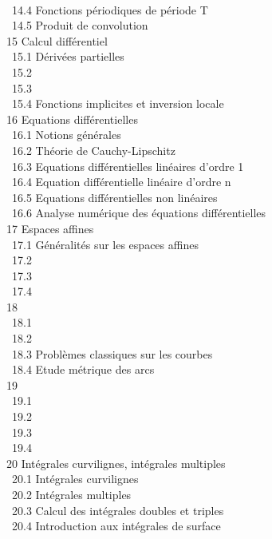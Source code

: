 \documentclass[]{article}
\begin{document}
\\ ~14.4 {Fonctions périodiques de
période T} \\ ~14.5 {Produit de
convolution} \\ 15 {Calcul
différentiel} \\ ~15.1 {Dérivées
partielles} \\ ~15.2
 \\ ~15.3
 \\ ~15.4
{Fonctions implicites et inversion
locale} \\ 16 {Equations
différentielles} \\ ~16.1 {Notions
générales} \\ ~16.2 {Théorie de
Cauchy-Lipschitz} \\ ~16.3
{Equations différentielles
linéaires d'ordre 1} \\ ~16.4
{Equation différentielle linéaire
d'ordre n} \\ ~16.5 {Equations
différentielles non linéaires} \\ ~16.6
{Analyse numérique des équations
différentielles} \\ 17 {Espaces
affines} \\ ~17.1 {Généralités sur
les espaces affines} \\ ~17.2
 \\ ~17.3
 \\
~17.4 
\\ 18  \\ ~18.1
 \\ ~18.2
 \\ ~18.3
{Problèmes classiques sur les
courbes} \\ ~18.4 {Etude métrique
des arcs} \\ 19  \\ ~19.1
 \\ ~19.2
 \\ ~19.3
 \\ ~19.4
 \\ 20
{Intégrales curvilignes, intégrales
multiples} \\ ~20.1 {Intégrales
curvilignes} \\ ~20.2 {Intégrales
multiples} \\ ~20.3 {Calcul des
intégrales doubles et triples} \\ ~20.4
{Introduction aux intégrales de
surface}
\end{document}

